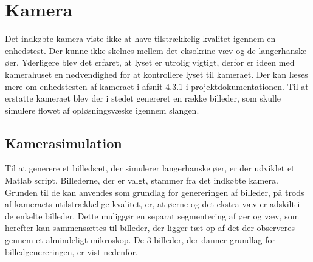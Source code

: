 \newpage
\section{Kamera}
Det indkøbte kamera viste ikke at have tilstrækkelig kvalitet igennem en enhedstest. Der kunne ikke skelnes mellem det eksokrine væv og de langerhanske øer. Yderligere blev det erfaret, at lyset er utrolig vigtigt, derfor er ideen med kamerahuset en nødvendighed for at kontrollere lyset til kameraet. Der kan læses mere om enhedstesten af kameraet i afsnit 4.3.1  i projektdokumentationen. Til at erstatte kameraet blev der i stedet genereret en række billeder, som skulle simulere flowet af opløsningsvæske igennem slangen.

\subsection{Kamerasimulation}
Til at generere et billedsæt, der simulerer langerhanske øer, er der udviklet et Matlab script. Billederne, der er valgt, stammer fra det indkøbte kamera. Grunden til de kan anvendes som grundlag for genereringen af billeder, på trods af kameraets utilstrækkelige kvalitet, er, at øerne og det ekstra væv er adskilt i de enkelte billeder. Dette muliggør en separat segmentering af øer og væv, som herefter kan sammensættes til billeder, der ligger tæt op af det der observeres gennem et almindeligt mikroskop. De 3 billeder, der danner grundlag for billedgenereringen, er vist nedenfor. 
